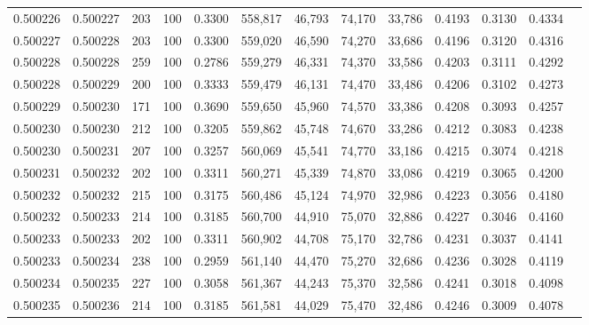\begin{tabular}{rrrrrrrrrrrrr}
0.500226 & 0.500227 &   203 & 100 &                                     0.3300 & 558,817 &  46,793 &  74,170 &  33,786 & 0.4193 & 0.3130 & 0.4334 \\
0.500227 & 0.500228 &   203 & 100 &                                     0.3300 & 559,020 &  46,590 &  74,270 &  33,686 & 0.4196 & 0.3120 & 0.4316 \\
0.500228 & 0.500228 &   259 & 100 &                                     0.2786 & 559,279 &  46,331 &  74,370 &  33,586 & 0.4203 & 0.3111 & 0.4292 \\
0.500228 & 0.500229 &   200 & 100 &                                     0.3333 & 559,479 &  46,131 &  74,470 &  33,486 & 0.4206 & 0.3102 & 0.4273 \\
0.500229 & 0.500230 &   171 & 100 &                                     0.3690 & 559,650 &  45,960 &  74,570 &  33,386 & 0.4208 & 0.3093 & 0.4257 \\
0.500230 & 0.500230 &   212 & 100 &                                     0.3205 & 559,862 &  45,748 &  74,670 &  33,286 & 0.4212 & 0.3083 & 0.4238 \\
0.500230 & 0.500231 &   207 & 100 &                                     0.3257 & 560,069 &  45,541 &  74,770 &  33,186 & 0.4215 & 0.3074 & 0.4218 \\
0.500231 & 0.500232 &   202 & 100 &                                     0.3311 & 560,271 &  45,339 &  74,870 &  33,086 & 0.4219 & 0.3065 & 0.4200 \\
0.500232 & 0.500232 &   215 & 100 &                                     0.3175 & 560,486 &  45,124 &  74,970 &  32,986 & 0.4223 & 0.3056 & 0.4180 \\
0.500232 & 0.500233 &   214 & 100 &                                     0.3185 & 560,700 &  44,910 &  75,070 &  32,886 & 0.4227 & 0.3046 & 0.4160 \\
0.500233 & 0.500233 &   202 & 100 &                                     0.3311 & 560,902 &  44,708 &  75,170 &  32,786 & 0.4231 & 0.3037 & 0.4141 \\
0.500233 & 0.500234 &   238 & 100 &                                     0.2959 & 561,140 &  44,470 &  75,270 &  32,686 & 0.4236 & 0.3028 & 0.4119 \\
0.500234 & 0.500235 &   227 & 100 &                                     0.3058 & 561,367 &  44,243 &  75,370 &  32,586 & 0.4241 & 0.3018 & 0.4098 \\
0.500235 & 0.500236 &   214 & 100 &                                     0.3185 & 561,581 &  44,029 &  75,470 &  32,486 & 0.4246 & 0.3009 & 0.4078 \\

\end{tabular}
